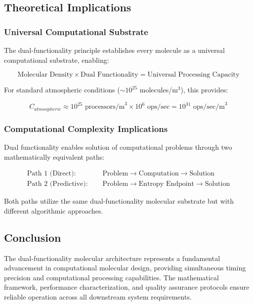\subsection{Theoretical Implications}

\subsubsection{Universal Computational Substrate}

The dual-functionality principle establishes every molecule as a universal computational substrate, enabling:

\begin{equation}
\text{Molecular Density} \times \text{Dual Functionality} = \text{Universal Processing Capacity}
\end{equation}

For standard atmospheric conditions ($\sim 10^{25}$ molecules/m$^3$), this provides:

\begin{equation}
C_{atmospheric} \approx 10^{25} \text{ processors/m}^3 \times 10^6 \text{ ops/sec} = 10^{31} \text{ ops/sec/m}^3
\end{equation}

\subsubsection{Computational Complexity Implications}

Dual functionality enables solution of computational problems through two mathematically equivalent paths:

\begin{align}
\text{Path 1 (Direct): } &\quad \text{Problem} \rightarrow \text{Computation} \rightarrow \text{Solution} \\
\text{Path 2 (Predictive): } &\quad \text{Problem} \rightarrow \text{Entropy Endpoint} \rightarrow \text{Solution}
\end{align}

Both paths utilize the same dual-functionality molecular substrate but with different algorithmic approaches.

\subsection{Conclusion}

The dual-functionality molecular architecture represents a fundamental advancement in computational molecular design, providing simultaneous timing precision and computational processing capabilities. The mathematical framework, performance characterization, and quality assurance protocols ensure reliable operation across all downstream system requirements.

